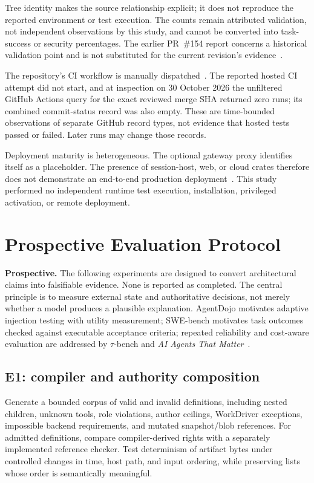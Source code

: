 Tree identity makes the source relationship explicit; it does not reproduce the reported environment or test execution. The counts remain attributed validation, not independent observations by this study, and cannot be converted into task-success or security percentages. The earlier PR~\#154 report concerns a historical validation point and is not substituted for the current revision's evidence~\cite{ref10}.

The repository's CI workflow is manually dispatched~\cite{ref46}. The reported hosted CI attempt did not start, and at inspection on 30 October 2026 the unfiltered GitHub Actions query for the exact reviewed merge SHA returned zero runs; its combined commit-status record was also empty. These are time-bounded observations of separate GitHub record types, not evidence that hosted tests passed or failed. Later runs may change those records.

Deployment maturity is heterogeneous. The optional gateway proxy identifies itself as a placeholder. The presence of session-host, web, or cloud crates therefore does not demonstrate an end-to-end production deployment~\cite{ref47}. This study performed no independent runtime test execution, installation, privileged activation, or remote deployment.

\section{Prospective Evaluation Protocol}
\label{sec:evaluation}

\textbf{Prospective.} The following experiments are designed to convert architectural claims into falsifiable evidence. None is reported as completed. The central principle is to measure external state and authoritative decisions, not merely whether a model produces a plausible explanation. AgentDojo motivates adaptive injection testing with utility measurement; SWE-bench motivates task outcomes checked against executable acceptance criteria; repeated reliability and cost-aware evaluation are addressed by $\tau$-bench and \emph{AI Agents That Matter}~\cite{ref48,ref49,ref50,ref51}.

\subsection{E1: compiler and authority composition}

Generate a bounded corpus of valid and invalid definitions, including nested children, unknown tools, role violations, author ceilings, WorkDriver exceptions, impossible backend requirements, and mutated snapshot/blob references. For admitted definitions, compare compiler-derived rights with a separately implemented reference checker. Test determinism of artifact bytes under controlled changes in time, host path, and input ordering, while preserving lists whose order is semantically meaningful.

